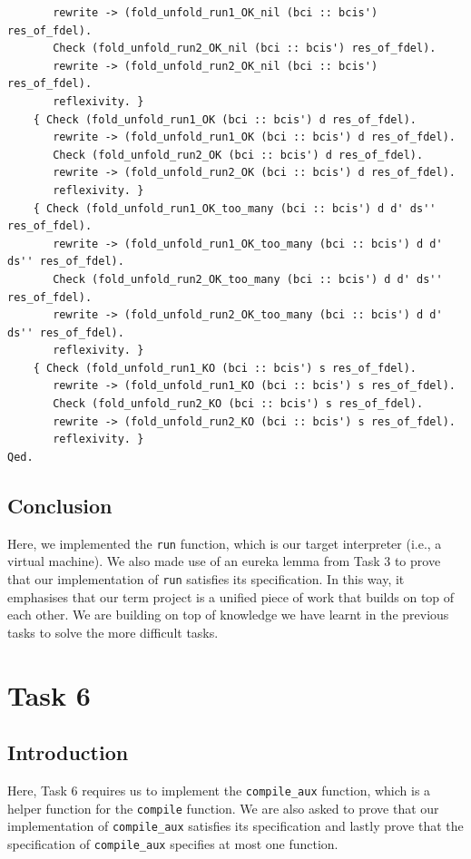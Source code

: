\documentclass{article}
\begin{document}
\begin{lstlisting}
       rewrite -> (fold_unfold_run1_OK_nil (bci :: bcis') res_of_fdel).
       Check (fold_unfold_run2_OK_nil (bci :: bcis') res_of_fdel).
       rewrite -> (fold_unfold_run2_OK_nil (bci :: bcis') res_of_fdel).
       reflexivity. }
    { Check (fold_unfold_run1_OK (bci :: bcis') d res_of_fdel).
       rewrite -> (fold_unfold_run1_OK (bci :: bcis') d res_of_fdel).
       Check (fold_unfold_run2_OK (bci :: bcis') d res_of_fdel).
       rewrite -> (fold_unfold_run2_OK (bci :: bcis') d res_of_fdel).
       reflexivity. }
    { Check (fold_unfold_run1_OK_too_many (bci :: bcis') d d' ds'' res_of_fdel).
       rewrite -> (fold_unfold_run1_OK_too_many (bci :: bcis') d d' ds'' res_of_fdel).
       Check (fold_unfold_run2_OK_too_many (bci :: bcis') d d' ds'' res_of_fdel).
       rewrite -> (fold_unfold_run2_OK_too_many (bci :: bcis') d d' ds'' res_of_fdel).
       reflexivity. }
    { Check (fold_unfold_run1_KO (bci :: bcis') s res_of_fdel).
       rewrite -> (fold_unfold_run1_KO (bci :: bcis') s res_of_fdel).
       Check (fold_unfold_run2_KO (bci :: bcis') s res_of_fdel).
       rewrite -> (fold_unfold_run2_KO (bci :: bcis') s res_of_fdel).
       reflexivity. }
Qed.
\end{lstlisting}

\subsection{Conclusion}

Here, we implemented the \texttt{run} function, which is our target interpreter (i.e., a virtual machine). We also made use of an eureka lemma from Task 3 to prove that our implementation of \texttt{run} satisfies its specification. In this way, it emphasises that our term project is a unified piece of work that builds on top of each other. We are building on top of knowledge we have learnt in the previous tasks to solve the more difficult tasks. 

\section{Task 6}

\subsection{Introduction}

Here, Task 6 requires us to implement the \texttt{compile\_aux} function, which is a helper function for the \texttt{compile} function. We are also asked to prove that our implementation of \texttt{compile\_aux} satisfies its specification and lastly prove that the specification of \texttt{compile\_aux} specifies at most one function.
\end{document}
